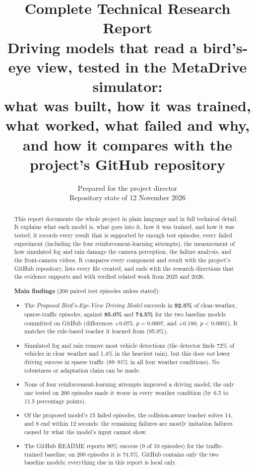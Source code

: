 \documentclass[11pt,a4paper]{article}
\title{\textbf{Complete Technical Research Report}\\[4pt]
\large Driving models that read a bird's-eye view, tested in the MetaDrive simulator:\\
what was built, how it was trained, what worked, what failed and why,\\
and how it compares with the project's GitHub repository}
\author{Prepared for the project director\\ Repository state of 12 November 2026}
\date{}
\begin{document}
\maketitle
\thispagestyle{empty}

\begin{abstract}
\noindent This report documents the whole project in plain language and in full technical detail. It explains what each model is, what goes into it, how it was trained, and how it was tested; it records every result that is supported by enough test episodes, every failed experiment (including the four reinforcement-learning attempts), the measurement of how simulated fog and rain damage the camera perception, the failure analysis, and the front-camera videos. It compares every component and result with the project's GitHub repository, lists every file created, and ends with the research directions that the evidence supports and with verified related work from 2025 and 2026.

\medskip\noindent\textbf{Main findings} (200 paired test episodes unless stated):
\begin{itemize}
\item The \emph{Proposed Bird's-Eye-View Driving Model} succeeds in \textbf{92.5\%} of clear-weather, sparse-traffic episodes, against \textbf{85.0\%} and \textbf{74.5\%} for the two baseline models committed on GitHub (differences $+0.075$, $p=0.0007$, and $+0.180$, $p<0.0001$). It matches the rule-based teacher it learned from (95.0\%).
\item Simulated fog and rain remove most vehicle detections (the detector finds 72\% of vehicles in clear weather and 1.4\% in the heaviest rain), but this does \emph{not} lower driving success in sparse traffic (89--91\% in all four weather conditions). No robustness or adaptation claim can be made.
\item None of four reinforcement-learning attempts improved a driving model; the only one tested on 200 episodes made it worse in every weather condition (by 6.5 to 11.5 percentage points).
\item Of the proposed model's 15 failed episodes, the collision-aware teacher solves 14, and 8 end within 12 seconds: the remaining failures are mostly imitation failures caused by what the model's input cannot show.
\item The GitHub README reports 90\% success (9 of 10 episodes) for the traffic-trained baseline; on 200 episodes it is 74.5\%. GitHub contains only the two baseline models; everything else in this report is local only.
\end{itemize}
\end{abstract}
\end{document}
